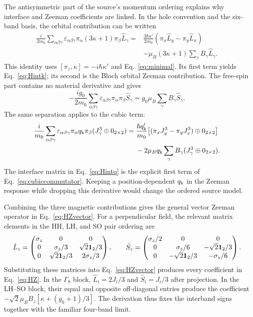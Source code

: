 The antisymmetric part of the source's momentum ordering explains why interface and Zeeman coefficients are linked. In the hole convention and the six-band basis, the orbital contribution can be written
\begin{align}
\frac{i}{2m_0}\sum_{\alpha\beta\gamma}
\varepsilon_{\alpha\beta\gamma}
\pi_\alpha(3\kappa+1)\pi_\beta\hat L_\gamma
={}&\frac{3\hbar\kappa'}{2m_0}
(\pi_x\hat L_y-\pi_y\hat L_x)
\nonumber\\
&-\mu_B(3\kappa+1)\sum_\gamma B_\gamma\hat L_\gamma.
\label{eq:orbitalcommutator}
\end{align}
This identity uses $[\pi_z,\kappa]=-i\hbar\kappa'$ and Eq.~\eqref{eq:minimal}. Its first term yields Eq.~\eqref{eq:Hintk}; its second is the Bloch orbital Zeeman contribution. The free-spin part contains no material derivative and gives
\begin{equation}
-\frac{ig_0}{2m_0}\sum_{\alpha\beta\gamma}
\varepsilon_{\alpha\beta\gamma}\pi_\alpha\pi_\beta\hat S_\gamma
=g_0\mu_B\sum_\gamma B_\gamma\hat S_\gamma.
\label{eq:spincommutator}
\end{equation}
The same separation applies to the cubic term:
\begin{align}
\frac{i}{m_0}\sum_{\alpha\beta\gamma}
\varepsilon_{\alpha\beta\gamma}\pi_\alpha q_{\mathrm k}\pi_\beta
(J_\gamma^3\oplus0_{2\times2})
={}&\frac{\hbar q_{\mathrm k}'}{m_0}
\bigl[(\pi_xJ_y^3-\pi_yJ_x^3)\oplus0_{2\times2}\bigr]
\nonumber\\
&-2\mu_Bq_{\mathrm k}\sum_\gamma B_\gamma
(J_\gamma^3\oplus0_{2\times2}).
\label{eq:cubiccommutator}
\end{align}
The interface matrix in Eq.~\eqref{eq:Hintq} is the explicit first term of Eq.~\eqref{eq:cubiccommutator}. Keeping a position-dependent $q_{\mathrm k}$ in the Zeeman response while dropping this derivative would change the ordered source model.

Combining the three magnetic contributions gives the general vector Zeeman operator in Eq.~\eqref{eq:HZvector}. For a perpendicular field, the relevant matrix elements in the HH, LH, and SO pair ordering are
\begin{equation}
\hat L_z=
\begin{pmatrix}
\sigma_z&0&0\\
0&\sigma_z/3&\sqrt2\mathbf 1_2/3\\
0&\sqrt2\mathbf 1_2/3&2\sigma_z/3
\end{pmatrix},
\qquad
\hat S_z=
\begin{pmatrix}
\sigma_z/2&0&0\\
0&\sigma_z/6&-\sqrt2\mathbf 1_2/3\\
0&-\sqrt2\mathbf 1_2/3&-\sigma_z/6
\end{pmatrix}.
\label{eq:LSz}
\end{equation}
Substituting these matrices into Eq.~\eqref{eq:HZvector} produces every coefficient in Eq.~\eqref{eq:HZ}. In the $\Gamma_8$ block, $\hat L_i=2J_i/3$ and $\hat S_i=J_i/3$ after projection. In the LH--SO block, their equal and opposite off-diagonal entries produce the coefficient $-\sqrt2\mu_BB_z[\kappa+(g_0+1)/3]$. The derivation thus fixes the interband signs together with the familiar four-band limit.

